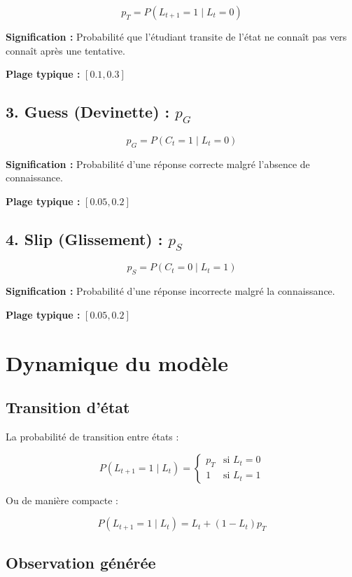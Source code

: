 \documentclass[12pt]{article}
\begin{document}
$$p_T = P(L_{t+1} = 1 \mid L_t = 0)$$

\textbf{Signification :} Probabilité que l'étudiant transite de l'état ne connaît pas vers connaît après une tentative.

\textbf{Plage typique :} $[0.1, 0.3]$

\subsection{3. Guess (Devinette) : $p_G$}

$$p_G = P(C_t = 1 \mid L_t = 0)$$

\textbf{Signification :} Probabilité d'une réponse correcte malgré l'absence de connaissance.

\textbf{Plage typique :} $[0.05, 0.2]$

\subsection{4. Slip (Glissement) : $p_S$}

$$p_S = P(C_t = 0 \mid L_t = 1)$$

\textbf{Signification :} Probabilité d'une réponse incorrecte malgré la connaissance.

\textbf{Plage typique :} $[0.05, 0.2]$

\section{Dynamique du modèle}

\subsection{Transition d'état}

La probabilité de transition entre états :

$$P(L_{t+1} = 1 \mid L_t) = \begin{cases}
        p_T & \text{si } L_t = 0 \\
        1   & \text{si } L_t = 1
    \end{cases}$$

Ou de manière compacte :

$$P(L_{t+1} = 1 \mid L_t) = L_t + (1-L_t)p_T$$

\subsection{Observation générée}
\end{document}

